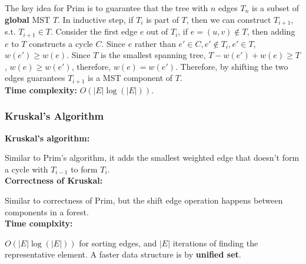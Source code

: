 The key idea for Prim is to guarantee that the tree with $n$ edges $T_n$ is a subset of \textbf{global} MST $T$. 
In inductive step, if $T_{i}$ is part of $T$, then we can construct $T_{i+1}$, s.t. $T_{i+1}\in T$.
Consider the first edge $e$ out of $T_{i}$, if $e=(u,v) \notin T$, then adding $e$ to $T$ constructs a cycle $C$. 
Since $e$ rather than $e' \in C, e' \notin T_{i}, e' \in T$, $w(e')\geq w(e)$. Since $T$ is the smallest spanning tree, $T-w(e')+w(e)\geq T$, $w(e)\geq w(e')$, therefore, $w(e)=w(e')$. Therefore, by shifting the two edges guarantees $T_{i+1}$ is a MST component of $T$.\\
\textbf{Time complexity:} $O(|E|\log(|E|))$.\\





\subsubsection{Kruskal's Algorithm}
\textbf{Kruskal's algorithm:} 

Similar to Prim's algorithm, it adds the smallest weighted edge that doesn't form a cycle with $T_{i-1}$ to form $T_i$.\\
\textbf{Correctness of Kruskal:} 

Similar to correctness of Prim, but the shift edge operation happens between components in a forest.\\
\textbf{Time complxity:}

$O(|E|\log(|E|))$ for sorting edges, and $|E|$ iterations of finding the representative element. A faster data structure is by \textbf{unified set}.\\
